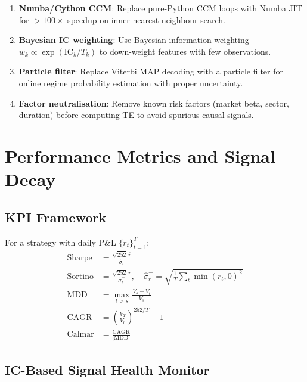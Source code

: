 \documentclass[12pt,a4paper]{article}
\begin{document}
\begin{enumerate}
    \item \textbf{Numba/Cython CCM}: Replace pure-Python CCM loops with
          Numba JIT for $>100\times$ speedup on inner nearest-neighbour search.
    \item \textbf{Bayesian IC weighting}: Use Bayesian information weighting
          $w_k \propto \exp(\text{IC}_k / T_k)$ to down-weight features with few
          observations.
    \item \textbf{Particle filter}: Replace Viterbi MAP decoding with a particle
          filter for online regime probability estimation with proper uncertainty.
    \item \textbf{Factor neutralisation}: Remove known risk factors (market beta,
          sector, duration) before computing TE to avoid spurious causal signals.
\end{enumerate}

\section{Performance Metrics and Signal Decay}

\subsection{KPI Framework}

For a strategy with daily P\&L $\{r_t\}_{t=1}^T$:
\begin{align}
    \text{Sharpe} &= \frac{\sqrt{252}\,\bar{r}}{\hat{\sigma}_r} \\[4pt]
    \text{Sortino} &= \frac{\sqrt{252}\,\bar{r}}{\hat{\sigma}_r^{-}}, \quad
    \hat{\sigma}_r^{-} = \sqrt{\frac{1}{T}\textstyle\sum_t \min(r_t,0)^2} \\[4pt]
    \text{MDD} &= \max_{t>s}\frac{V_s - V_t}{V_s} \\[4pt]
    \text{CAGR} &= \left(\frac{V_T}{V_0}\right)^{252/T} - 1 \\[4pt]
    \text{Calmar} &= \frac{\text{CAGR}}{|\text{MDD}|}
\end{align}

\subsection{IC-Based Signal Health Monitor}
\end{document}
